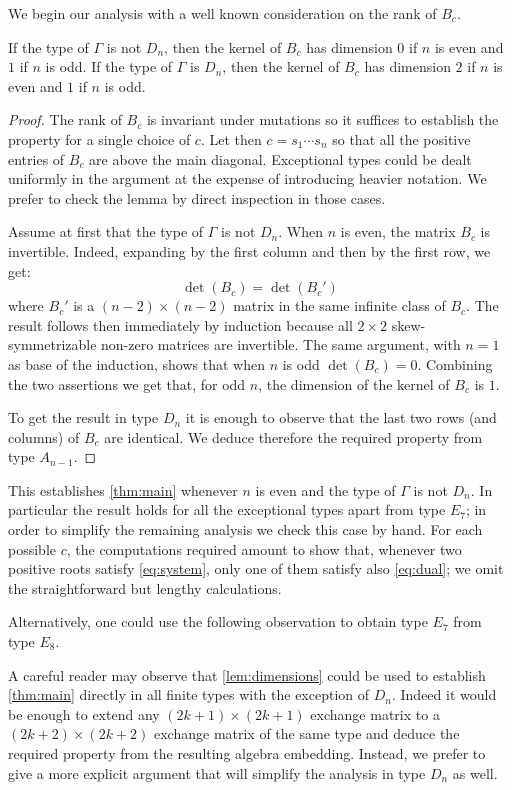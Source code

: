 \documentclass[pdftex]{sigma}
\numberwithin{equation}{section}
\numberwithin{theorem}{section}
\numberwithin{proposition}{section}
\numberwithin{lemma}{section}
\numberwithin{corollary}{section}
\numberwithin{definition}{section}
\numberwithin{example}{section}
\numberwithin{remark}{section}
\numberwithin{note}{section}
\begin{document}
  We begin our analysis with a well known consideration on the rank of $B_c$.
  \begin{lemma}
    \label{lem:dimensions}
    If the type of $\Gamma$ is not $D_n$, then the kernel of $B_c$ has dimension $0$ if $n$ is even and $1$ if $n$ is odd.
    If the type of $\Gamma$ is $D_n$, then the kernel of $B_c$ has dimension $2$ if $n$ is even and $1$ if $n$ is odd.
  \end{lemma}
  \begin{proof}
    The rank of $B_c$ is invariant under mutations so it suffices to establish the property for a single choice of $c$.
    Let then $c=s_1\cdots s_n$ so that all the positive entries of $B_c$ are above the main diagonal.
    Exceptional types could be dealt uniformly in the argument at the expense of introducing heavier notation.
    We prefer to check the lemma by direct inspection in those cases.

    Assume at first that the type of $\Gamma$ is not $D_n$.
    When $n$ is even, the matrix $B_c$ is invertible.
    Indeed, expanding by the first column and then by the first row, we get:
    \[
      \det(B_c)=\det(B_c')
    \]
    where $B_c'$ is a $(n-2)\times(n-2)$ matrix in the same infinite class of $B_c$.
    The result follows then immediately by induction because all $2\times2$ skew-symmetrizable non-zero matrices are invertible.
    The same argument, with $n=1$ as base of the induction, shows that when $n$ is odd $\det(B_c)=0$.
    Combining the two assertions we get that, for odd $n$, the dimension of the kernel of $B_c$ is $1$.

    To get the result in type $D_n$ it is enough to observe that the last two rows (and columns) of $B_c$ are identical.
    We deduce therefore the required property from type $A_{n-1}$.
  \end{proof}

  This establishes \cref{thm:main} whenever $n$ is even and the type of $\Gamma$ is not $D_n$.
  In particular the result holds for all the exceptional types apart from type $E_7$; in order to simplify the remaining analysis we check this case by hand.
  For each possible $c$, the computations required amount to show that, whenever two positive roots satisfy \cref{eq:system}, only one of them satisfy also \cref{eq:dual}; we omit the straightforward but lengthy calculations.

  Alternatively, one could use the following observation to obtain type $E_7$ from type $E_8$.

  \begin{remark}
    \label{rk:induction}
    A careful reader may observe that \cref{lem:dimensions} could be used to establish \cref{thm:main} directly in all finite types with the exception of $D_n$.
    Indeed it would be enough to extend any $(2k+1) \times (2k+1)$ exchange matrix to a $(2k+2) \times (2k+2)$ exchange matrix of the same type and deduce the required property from the resulting algebra embedding.
    Instead, we prefer to give a more explicit argument that will simplify the analysis in type $D_n$ as well.
  \end{remark}
\end{document}
